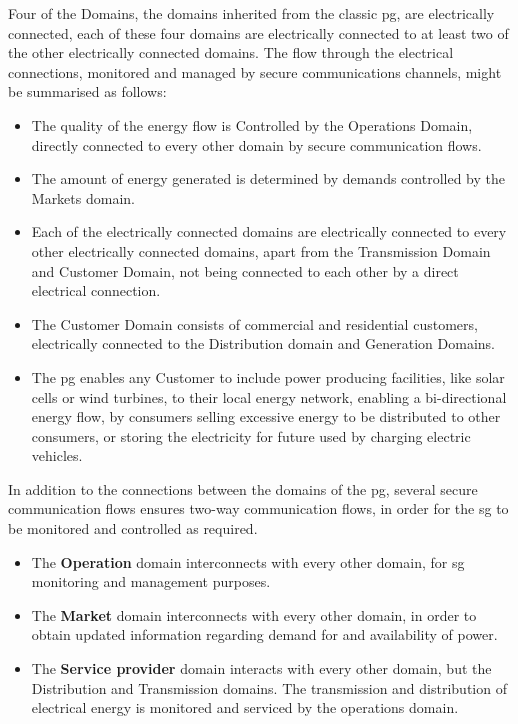 Four of the Domains, the domains inherited from the classic \acrshort{pg}, are electrically connected, each of these four domains are electrically connected to at least two of the other electrically connected domains. The flow through the electrical connections, monitored and managed by secure communications channels, might be summarised as follows:

\begin{itemize}

\item The quality of the energy flow is Controlled by the Operations Domain, directly connected to every other domain by secure communication flows.  

\item The amount of energy generated is determined by demands controlled by the Markets domain.

\item Each of the electrically connected domains are electrically connected to every other electrically connected domains, apart from the Transmission Domain and Customer Domain, not being connected to each other by a direct electrical connection.

\item The Customer Domain consists of commercial and residential customers, electrically connected to the Distribution domain and Generation Domains. 

\item The \acrshort{pg} enables any Customer to include power producing facilities, like solar cells or wind turbines, to their local energy network, enabling a bi-directional energy flow, by consumers selling excessive energy to be distributed to other consumers, or storing the electricity for future used by charging electric vehicles.



\end{itemize}

In addition to the connections between the domains of the \acrshort{pg}, several secure communication flows ensures two-way communication flows, in order for the \acrshort{sg} to be monitored and controlled as required. 

\begin{itemize}
\item The \textbf{Operation} domain interconnects with every other domain, for \acrshort{sg} monitoring and management purposes.
\item The \textbf{Market} domain interconnects with every other domain, in order to obtain updated information regarding demand for and availability of power.
\item The \textbf{Service provider} domain interacts with every other domain, but the Distribution and Transmission domains. The transmission and distribution of electrical energy is monitored and serviced by the operations domain.
\end{itemize}


